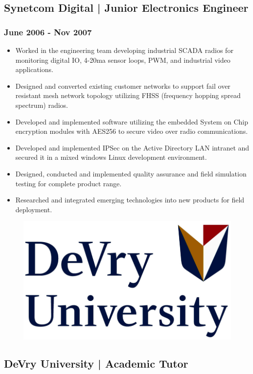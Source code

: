 \documentclass[letter,10pt]{article}
\begin{document}
\subsection*{Synetcom Digital | Junior Electronics Engineer}
\label{sec:org8cbb130}
\subsubsection*{June 2006 - Nov 2007}
\label{sec:org0ce9c88}
\begin{itemize}
\item Worked in the engineering team developing industrial SCADA radios for monitoring digital IO, 4-20ma sensor loops, PWM, and industrial video applications.
\item Designed and converted existing customer networks to support fail over resistant mesh network topology utilizing FHSS (frequency hopping spread spectrum) radios.
\item Developed and implemented software utilizing the embedded System on Chip encryption modules with AES256 to secure video over radio communications.
\item Developed and implemented IPSec on the Active Directory LAN intranet and secured it in a mixed windows Linux development environment.
\item Designed, conducted and implemented quality assurance and field simulation testing for complete product range.
\item Researched and integrated emerging technologies into new products for field deployment.
\end{itemize}

\begin{figure}
\includegraphics[width=0.8\linewidth]{./img/50p_cr_devry.jpg}
\end{figure}

\subsection*{DeVry University | Academic Tutor}
\label{sec:orge7d2cc8}
\end{document}
